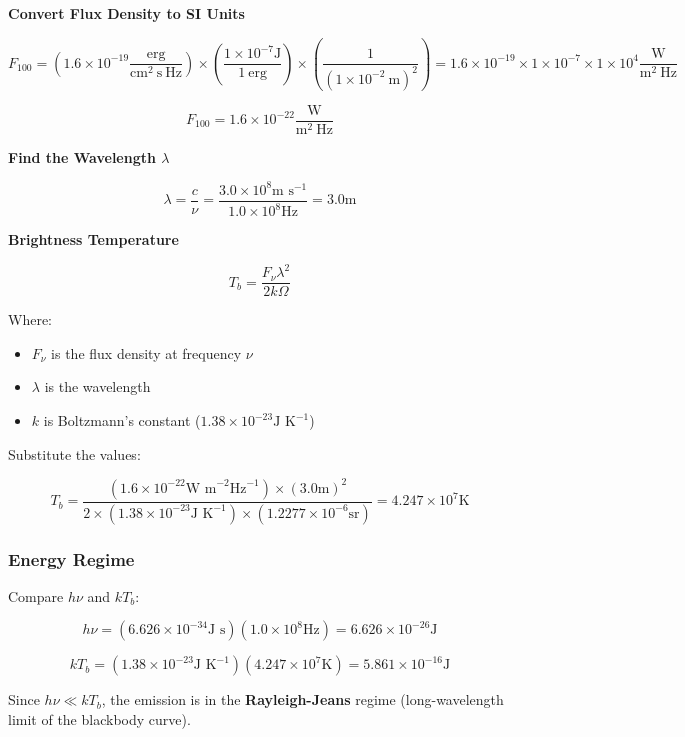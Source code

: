 \documentclass[12pt]{article}
\begin{document}
\textbf{Convert Flux Density to SI Units}

{\tiny
    \[
        F_{100} = \left(1.6 \times 10^{-19} \frac{\text{erg}}{\text{cm}^2\ \text{s}\ \text{Hz}}\right) \times \left( \dfrac{1 \times 10^{-7}\text{J}}{1\ \text{erg}} \right) \times \left( \dfrac{1}{{(1 \times 10^{-2}\ \text{m})}^2} \right) = 1.6 \times 10^{-19} \times 1 \times 10^{-7} \times 1 \times 10^{4} \frac{\text{W}}{\text{m}^2\ \text{Hz}}
    \]
}

\[
    F_{100} = 1.6 \times 10^{-22} \frac{\text{W}}{\text{m}^2\ \text{Hz}}
\]

\textbf{Find the Wavelength $\lambda$}

\[
    \lambda = \dfrac{c}{\nu} = \dfrac{3.0 \times 10^8\text{m s}^{-1}}{1.0 \times 10^8\text{Hz}} = 3.0\text{m}
\]

\textbf{Brightness Temperature}

\[
    T_b = \dfrac{F_\nu \lambda^2}{2 k \Omega}
\]

Where:
\begin{itemize}
    \item $F_\nu$ is the flux density at frequency $\nu$
    \item $\lambda$ is the wavelength
    \item $k$ is Boltzmann's constant ($1.38 \times 10^{-23}\text{J K}^{-1}$)
\end{itemize}

Substitute the values:

\[
    T_b = \dfrac{(1.6 \times 10^{-22}\text{W m}^{-2}\text{Hz}^{-1}) \times {(3.0\text{m})}^2}{2 \times (1.38 \times 10^{-23}\text{J K}^{-1}) \times (1.2277 \times 10^{-6}\text{sr})} = 4.247 \times 10^{7}\text{K}
\]

\subsubsection{Energy Regime}

Compare $h \nu$ and $k T_b$:

\[
    h \nu = (6.626 \times 10^{-34}\text{J s})(1.0 \times 10^{8}\text{Hz}) = 6.626 \times 10^{-26}\text{J}
\]

\[
    k T_b = (1.38 \times 10^{-23}\text{J K}^{-1})(4.247 \times 10^{7}\text{K}) = 5.861 \times 10^{-16}\text{J}
\]

Since $h \nu \ll k T_b$, the emission is in the \textbf{Rayleigh-Jeans} regime (long-wavelength limit of the blackbody curve).

\bigskip
\end{document}

